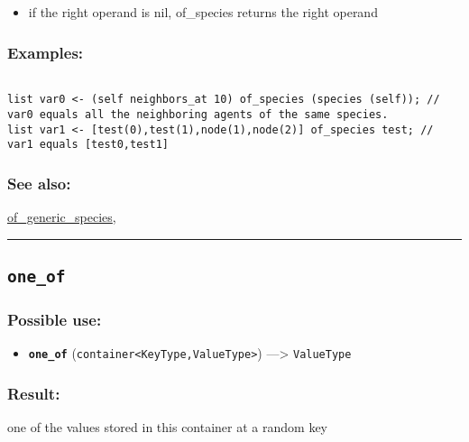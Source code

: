 \documentclass[]{book}
\providecommand{\tightlist}{%
  \setlength{\itemsep}{0pt}\setlength{\parskip}{0pt}}
\theoremstyle{definition}
\theoremstyle{definition}
\theoremstyle{definition}
\theoremstyle{remark}
\begin{document}
\begin{itemize}
\tightlist
\item
  if the right operand is nil, of\_species returns the right operand
\end{itemize}

\subsubsection{Examples:}\label{examples-262}

\begin{verbatim}
 
list var0 <- (self neighbors_at 10) of_species (species (self)); // var0 equals all the neighboring agents of the same species. 
list var1 <- [test(0),test(1),node(1),node(2)] of_species test; // var1 equals [test0,test1]
\end{verbatim}

\subsubsection{See also:}\label{see-also-150}

\href{OperatorsNR\#of_generic_species}{of\_generic\_species},

\begin{center}\rule{0.5\linewidth}{\linethickness}\end{center}

\subsection{\texorpdfstring{\texttt{one\_of}}{one\_of}}\label{one_of}

\subsubsection{Possible use:}\label{possible-use-383}

\begin{itemize}
\tightlist
\item
  \textbf{\texttt{one\_of}}
  (\texttt{container\textless{}KeyType,ValueType\textgreater{}})
  ---\textgreater{} \texttt{ValueType}
\end{itemize}

\subsubsection{Result:}\label{result-369}

one of the values stored in this container at a random key
\end{document}
